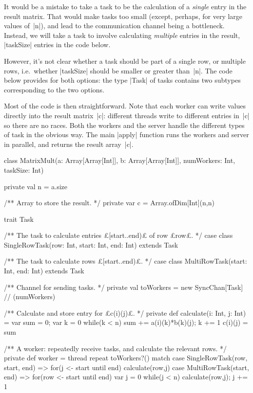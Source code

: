 \begin{answerI}
It would be a mistake to take a task to be the calculation of a \emph{single}
entry in the result matrix.  That would make tasks too small (except, perhaps,
for very large values of~|n|), and lead to the communication channel being a
bottleneck.  Instead, we will take a task to involve calculating
\emph{multiple} entries in the result, |taskSize| entries in the code below.  

However, it's not clear whether a task should be part of a single row, or
multiple rows, i.e.~whether |taskSize| should be smaller or greater than~|n|.
The code below provides for both options: the type |Task| of tasks contains
two subtypes corresponding to the two options.

Most of the code is then straightforward.  Note that each worker can write
values directly into the result matrix~|c|: different threads write to
different entries in~|c| so there are no races.  Both the workers and the
server handle the different types of task in the obvious way.  The main
|apply| function runs the workers and server in parallel, and returns the
result array~|c|.
%
\begin{scala}
class MatrixMult(a: Array[Array[Int]], b: Array[Array[Int]],
             numWorkers: Int, taskSize: Int){
  private val n = a.size

  /** Array to store the result. */
  private var c = Array.ofDim[Int](n,n)

  trait Task

  /** The task to calculate entries £[start..end)£ of row £row£. */
  case class SingleRowTask(row: Int, start: Int, end: Int) extends Task 

  /** The task to calculate rows £[start..end)£. */
  case class MultiRowTask(start: Int, end: Int) extends Task

  /** Channel for sending tasks. */
  private val toWorkers = new SyncChan[Task] // (numWorkers)

  /** Calculate and store entry for £c(i)(j)£. */
  private def calculate(i: Int, j: Int) = {
    var sum = 0; var k = 0
    while(k < n){ sum += a(i)(k)*b(k)(j); k += 1 }
    c(i)(j) = sum
  }

  /** A worker: repeatedly receive tasks, and calculate the relevant rows. */
  private def worker = thread{
    repeat{
      toWorkers?() match{
        case SingleRowTask(row, start, end) =>
          for(j <- start until end) calculate(row,j)
        case MultiRowTask(start, end) => 
          for(row <- start until end){
            var j = 0
            while(j < n){ calculate(row,j); j += 1 }
          }
      }
    }
  }

}
\end{scala}
\end{answerI}
